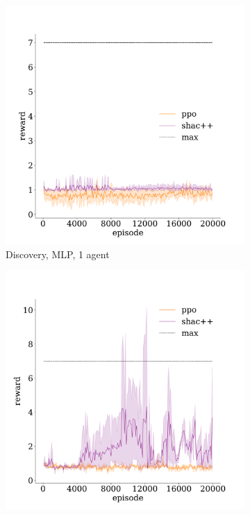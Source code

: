\begin{figure}[!t]
    \begin{subfigure}[b]{0.30\textwidth}
        \includegraphics[width=\textwidth]{figs/discovery-1-mlp.pdf}
        \caption{Discovery, MLP, 1 agent}
        \label{fig:discovery-mlp-1}
    \end{subfigure}
    \begin{subfigure}[b]{0.30\textwidth}
        \includegraphics[width=\textwidth]{figs/discovery-3-transformer.pdf}

\end{subfigure}
\end{figure}
